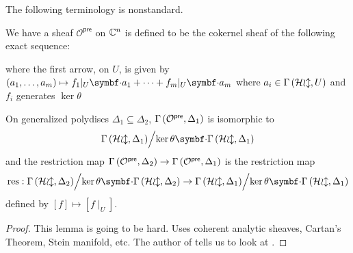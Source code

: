 The following terminology is nonstandard.
\begin{definition}\label{def:preanalytification-sheaf}
  We have a sheaf $\mathcal{O}^{\mathsf{pre}}$ on $\mathbb{C}^{n}$ is defined to be the cokernel sheaf of the following exact sequence:
	\begin{center}
	\end{center}
	where the first arrow, on $U$, is given by $(a_{1},\dots,a_{m}) \mapsto f_{1}|_{U}\smul a_{1}+\cdots+f_{m}|_{U}\smul a_{m}$ where $a_{i} \in {\Gamma\left(\mathcal{Hol},U\right)}$ and $f_{i}$ generates $\ker\theta$
\end{definition}

\begin{lemma}
	On generalized polydiscs $\Delta_{1} \subseteq \Delta_{2}$, ${\Gamma\left(\mathcal{O}^{\mathsf{pre}},\Delta_{1}\right)}$ is isomorphic to \[\quotient{\sections{\mathcal{Hol}}{\Delta_{1}}}{\ker\theta\smul\sections{\mathcal{Hol}}{\Delta_{1}}}\] and the restriction map ${\Gamma\left({\mathcal{O}^{\mathsf{pre}}},\Delta_{2}\right)} \to {\Gamma\left({\mathcal{O}^{\mathsf{pre}}},\Delta_{1}\right)}$ is the restriction map
	\[
		\mathrm{res} :
		\quotient{\sections{\mathcal{Hol}}{\Delta_{2}}}{\ker\theta\smul\sections{\mathcal{Hol}}{\Delta_{2}}} \to
		\quotient{\sections{\mathcal{Hol}}{\Delta_{1}}}{\ker\theta\smul\sections{\mathcal{Hol}}{\Delta_{1}}}
	\]
	defined by $[f] \mapsto [f\mid_{U}]$.
\end{lemma}
\begin{proof}
	This lemma is going to be hard. Uses coherent analytic sheaves, Cartan's Theorem, Stein manifold, etc. The author of \cite[page~108]{neeman2007algebraic} tells us to look at \cite[page~136, definition 2; page 243, theorem 2]{gunning2022analytic}.
\end{proof}


